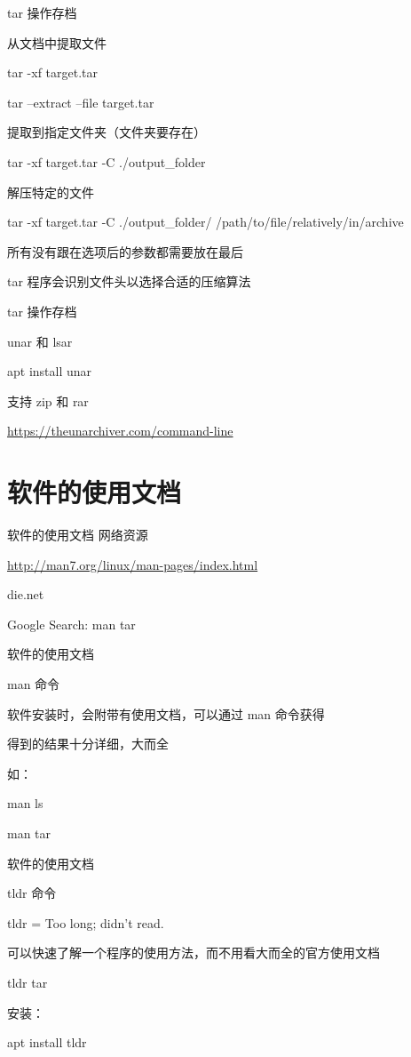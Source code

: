 \documentclass[UTF8]{ctexbeamer}
\begin{document}
\begin{frame}{tar 操作存档}

    从文档中提取文件

    tar -xf target.tar

    tar --extract --file target.tar

    提取到指定文件夹（文件夹要存在）

    tar -xf target.tar -C ./output\_folder

    解压特定的文件

    tar -xf target.tar -C ./output\_folder/ /path/to/file/relatively/in/archive

    所有没有跟在选项后的参数都需要放在最后

    tar 程序会识别文件头以选择合适的压缩算法
    
\end{frame}
\begin{frame}{tar 操作存档}

    unar 和 lsar
    
    apt install unar
    
    支持 zip 和 rar
    
    \url{https://theunarchiver.com/command-line}
    
\end{frame}
\section{软件的使用文档}
\begin{frame}{软件的使用文档}
    网络资源
    
    \url{http://man7.org/linux/man-pages/index.html}
    
    die.net
    
    Google Search: man tar
\end{frame}
\begin{frame}{软件的使用文档}

    man 命令
    
    软件安装时，会附带有使用文档，可以通过 man 命令获得
    
    得到的结果十分详细，大而全
    
    如：
    
    man ls
    
    man tar
    
\end{frame}

\begin{frame}{软件的使用文档}

    tldr 命令

    tldr = Too long; didn't read.

    可以快速了解一个程序的使用方法，而不用看大而全的官方使用文档

    tldr tar

    安装：

    apt install tldr
\end{frame}
\end{document}
